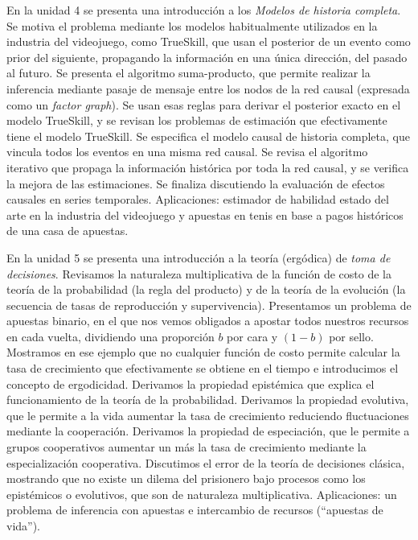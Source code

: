 \documentclass[a4paper,11pt]{book}
\theoremstyle{definition}
\begin{document}

En la unidad 4 se presenta una introducci\'on a los \emph{Modelos de historia completa}.
%
Se motiva el problema mediante los modelos habitualmente utilizados en la industria del videojuego, como TrueSkill, que usan el posterior de un evento como prior del siguiente, propagando la informaci\'on en una \'unica direcci\'on, del pasado al futuro.
%
Se presenta el algoritmo suma-producto, que permite realizar la inferencia mediante pasaje de mensaje entre los nodos de la red causal (expresada como un \emph{factor graph}).
%
Se usan esas reglas para derivar el posterior exacto en el modelo TrueSkill, y se revisan los problemas de estimaci\'on que efectivamente tiene el modelo TrueSkill.
%
Se especifica el modelo causal de historia completa, que vincula todos los eventos en una misma red causal.
%
Se revisa el algoritmo iterativo que propaga la informaci\'on hist\'orica por toda la red causal, y se verifica la mejora de las estimaciones.
%
Se finaliza discutiendo la evaluaci\'on de efectos causales en series temporales.
%
Aplicaciones: estimador de habilidad estado del arte en la industria del videojuego y apuestas en tenis en base a pagos hist\'oricos de una casa de apuestas.


En la unidad 5 se presenta una introducci\'on a la teor\'ia (erg\'odica) de \emph{toma de decisiones}.
%
Revisamos la naturaleza multiplicativa de la funci\'on de costo de la teor\'ia de la probabilidad (la regla del producto) y de la teor\'ia de la evoluci\'on (la secuencia de tasas de reproducci\'on y supervivencia).
%
Presentamos un problema de apuestas binario, en el que nos vemos obligados a apostar todos nuestros recursos en cada vuelta, dividiendo una proporci\'on $b$ por cara y $(1-b)$ por sello.
%
Mostramos en ese ejemplo que no cualquier funci\'on de costo permite calcular la tasa de crecimiento que efectivamente se obtiene en el tiempo e introducimos el concepto de ergodicidad.
%
Derivamos la propiedad epist\'emica que explica el funcionamiento de la teor\'ia de la probabilidad.
%
Derivamos la propiedad evolutiva, que le permite a la vida aumentar la tasa de crecimiento reduciendo fluctuaciones mediante la cooperaci\'on.
%
Derivamos la propiedad de especiaci\'on, que le permite a grupos cooperativos aumentar un m\'as la tasa de crecimiento mediante la especializaci\'on cooperativa.
%
%
Discutimos el error de la teor\'ia de decisiones cl\'asica, mostrando que no existe un dilema del prisionero bajo procesos como los epist\'emicos o evolutivos, que son de naturaleza multiplicativa.
%
Aplicaciones: un problema de inferencia con apuestas e intercambio de recursos (``apuestas de vida'').
\end{document}
